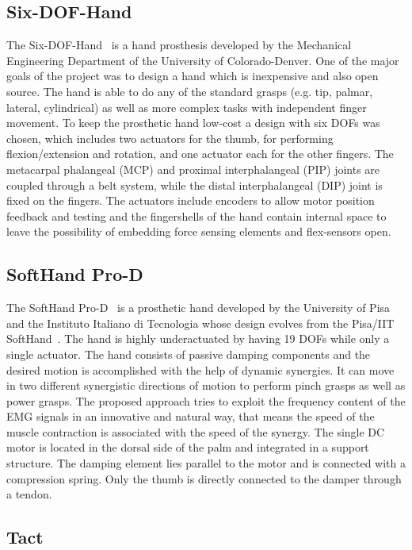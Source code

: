 \documentclass[a4paper, 10pt, conference]{ieeeconf}      %
\begin{document}
\subsection{Six-DOF-Hand}

The Six-DOF-Hand~\cite{6dofhand} is a hand prosthesis developed by the Mechanical Engineering Department of the University of Colorado-Denver. One of the major goals of the project was to design a hand which is inexpensive and also open source. The hand is able to do any of the standard grasps (e.g. tip, palmar, lateral, cylindrical) as well as more complex tasks with independent finger movement. To keep the prosthetic hand low-cost a design with six DOFs was chosen, which includes two actuators for the thumb, for performing flexion/extension and rotation, and one actuator each for the other fingers. The metacarpal phalangeal (MCP) and proximal interphalangeal (PIP) joints are coupled through a belt system, while the distal interphalangeal (DIP) joint is fixed on the fingers. The actuators include encoders to allow motor position feedback and testing and the fingershells of the hand contain internal space to leave the possibility of embedding force sensing elements and flex-sensors open.

\subsection{SoftHand Pro-D}

The SoftHand Pro-D~\cite{softhand} is a prosthetic hand developed by the University of Pisa and the Instituto Italiano di Tecnologia whose design evolves from the Pisa/IIT SoftHand~\cite{pisahand}. The hand is highly underactuated by having 19 DOFs while only a single actuator. The hand consists of passive damping components and the desired motion is accomplished with the help of dynamic synergies. It can move in two different synergistic directions of motion to perform pinch grasps as well as power grasps. The proposed approach tries to exploit the frequency content of the EMG signals in an innovative and natural way, that means the speed of the muscle contraction is associated with the speed of the synergy. The single DC motor is located in the dorsal side of the palm and integrated in a support structure. The damping element lies parallel to the motor and is connected with a compression spring. Only the thumb is directly connected to the damper through a tendon.

\subsection{Tact}
\end{document}
